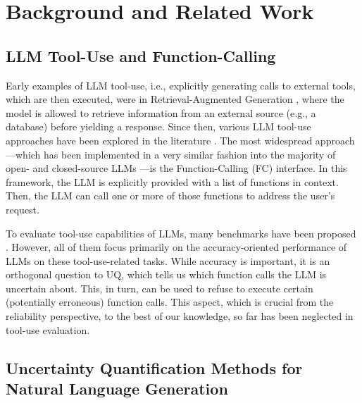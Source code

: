 \section{Background and Related Work}
\label{sec:related_work}


\subsection{LLM Tool-Use and Function-Calling}

Early examples of LLM tool-use, i.e., explicitly generating calls to external tools, which are then executed, were in Retrieval-Augmented Generation \citep{lewis2020retri},
where the model is allowed to retrieve information from an external source (e.g., a database) before yielding a response.
Since then, various LLM tool-use approaches have been explored in the literature 
\citep{yao2023react,schick2023toolf,qin2023tool}. The most widespread approach---which has been implemented in a very similar fashion into the majority of open- and closed-source LLMs
\citep{carrigan2024tool,openai2025fc,gemini2025fc}---is the Function-Calling (FC) interface.
In this framework, 
the LLM is explicitly provided with a list of functions in context.
Then, the LLM can call one or more of those functions to address the user's request. 








To evaluate tool-use capabilities of LLMs, many benchmarks have been proposed 
\citep{bfcl,qin2024tooll,li2023api-b,lu2024tools}.
However, all of them focus primarily on the accuracy-oriented performance of LLMs on these tool-use-related tasks. 
While accuracy is important, it is an orthogonal question to UQ, which tells us which function calls the LLM is uncertain about. 
This, in turn, can be used to refuse to execute certain  (potentially erroneous) function calls. 
This aspect, which is crucial from the reliability perspective, to the best of our knowledge, so far has been neglected in tool-use evaluation.






\subsection{Uncertainty Quantification Methods for Natural Language Generation}
\label{sec:uq-methods}

